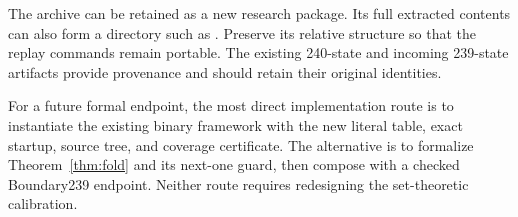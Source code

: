 The archive can be retained as a new 
research package. Its full extracted contents can also form
a directory such as
.
Preserve its relative structure so that the replay commands
remain portable. The existing 240-state and incoming
239-state artifacts provide provenance and should retain
their original identities.

For a future formal endpoint, the most direct implementation
route is to instantiate the existing binary framework with
the new literal table, exact startup, source tree, and
coverage certificate. The alternative is to formalize
Theorem~\ref{thm:fold} and its next-one guard, then compose
with a checked Boundary239 endpoint. Neither route requires
redesigning the set-theoretic calibration.
